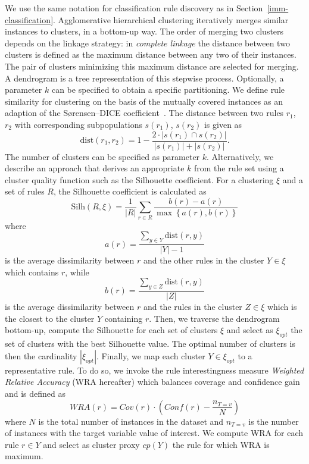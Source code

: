 \documentclass[
  oneside]{book}
\begin{document}
We use the same notation for classification rule discovery as in Section~\ref{imm-classification}.
Agglomerative hierarchical clustering iteratively merges similar instances to clusters, in a bottom-up way.
The order of merging two clusters depends on the linkage strategy: in \emph{complete linkage} the distance between two clusters is defined as the maximum distance between any two of their instances.
The pair of clusters minimizing this maximum distance are selected for merging.
A dendrogram is a tree representation of this stepwise process.
Optionally, a parameter \(k\) can be specified to obtain a specific partitioning.
We define rule similarity for clustering on the basis of the mutually covered instances as an adaption of the Sørensen--DICE coefficient~\autocite{Dice45}.
The distance between two rules \(r_1\), \(r_2\) with corresponding subpopulations \(s(r_1)\), \(s(r_2)\) is given as
\begin{equation}
\text{dist}(r_1,r_2) = 1 - \frac{2\cdot\left|s(r_1)\cap s(r_2)\right|}{\left|s(r_1)\right| + \left|s(r_2)\right|}.
\label{eq:dice}
\end{equation}
The number of clusters can be specified as parameter \(k\).
Alternatively, we describe an approach that derives an appropriate \(k\) from the rule set using a cluster quality function such as the Silhouette coefficient.
For a clustering \(\xi\) and a set of rules \(R\), the Silhouette coefficient is calculated as
\begin{equation}
\text{Silh}(R,\xi) = \frac{1}{|R|}\sum_{r\in R}{\frac{b(r)-a(r)}{\max\left\{a(r), b(r)\right\}}}
\label{eq:silh}
\end{equation}
where
\begin{equation}
a(r)=\frac{\sum_{y\in{}Y}\text{dist}(r,y)}{|Y|-1}
\label{eq:silh-a}
\end{equation}
is the average dissimilarity between \(r\) and the other rules in the cluster \(Y\in\xi\) which contains \(r\), while
\begin{equation}
b(r)=\frac{\sum_{y\in{}Z}\text{dist}(r,y)}{|Z|}
\label{eq:silh-b}
\end{equation}
is the average dissimilarity between \(r\) and the rules in the cluster \(Z\in\xi\) which is the closest to the cluster \(Y\) containing \(r\).
Then, we traverse the dendrogram bottom-up, compute the Silhouette for each set of clusters \(\xi\) and select as \(\xi_{opt}\) the set of clusters with the best Silhouette value.
The optimal number of clusters is then the cardinality \(|\xi_{opt}|\).
Finally, we map each cluster \(Y\in\xi_{opt}\) to a representative rule.
To do so, we invoke the rule interestingness measure \emph{Weighted Relative Accuracy} (WRA hereafter) which balances coverage and confidence gain and is defined as
\begin{equation}
WRA(r)=Cov(r)\cdot\left(Conf(r)-\frac{n_{T=v}}{N}\right)
\label{eq:wra}
\end{equation}
where \(N\) is the total number of instances in the dataset and \(n_{T=v}\) is the number of instances with the target variable value of interest.
We compute WRA for each rule \(r\in{Y}\) and select as cluster proxy \(cp(Y)\) the rule for which WRA is maximum.
\end{document}
